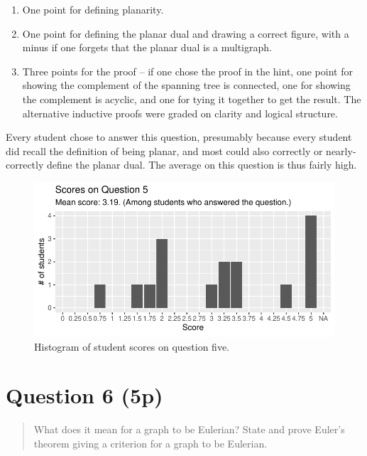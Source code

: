 \documentclass[nobib]{tufte-handout}
\begin{document}
\begin{enumerate}
  \item One point for defining planarity.
  \item One point for defining the planar dual and drawing a correct figure, with a minus if one forgets that the planar dual is a multigraph.
  \item Three points for the proof -- if one chose the proof in the hint, one point for showing the complement of the spanning tree is connected, one for showing the complement is acyclic, and one for tying it together to get the result. The alternative inductive proofs were graded on clarity and logical structure.
\end{enumerate}

Every student chose to answer this question, presumably because every student did recall the definition of being planar, and most could also correctly or nearly-correctly define the planar dual. The average on this question is thus fairly high.

\begin{figure}[p]
  \centering
  \includegraphics[width = \textwidth]{Q5.pdf}
  \caption[Score histogram for Q5]{Histogram of student scores on question five.}
  \label{fig:Q5}
\end{figure}

\section{Question 6 (5p)} %

\begin{quotation}
  What does it mean for a graph to be Eulerian? State and prove Euler's theorem giving a criterion for a graph to be Eulerian.
\end{quotation}
\end{document}
